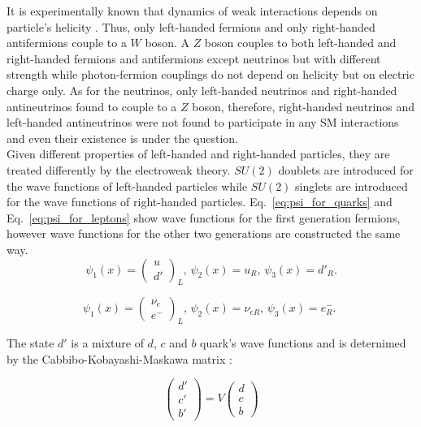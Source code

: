 It is experimentally known that dynamics of weak interactions depends on particle's helicity \cite{ref_Griffiths}. Thus, only left-handed fermions and only right-handed antifermions couple to a $W$ boson. A $Z$ boson couples to both left-handed and right-handed fermions and antifermions except neutrinos but with different strength while photon-fermion couplings do not depend on helicity but on electric charge only. As for the neutrinos, only left-handed neutrinos and right-handed antineutrinos found to couple to a $Z$ boson, therefore, right-handed neutrinos and left-handed antineutrinos were not found to participate in any SM interactions and even their existence is under the question.\\

Given different properties of left-handed and right-handed particles, they are treated differently by the electroweak theory. $SU(2)$ doublets are introduced for the wave functions of left-handed particles while $SU(2)$ singlets are introduced for the wave functions of right-handed particles. Eq.~\ref{eq:psi_for_quarks} and Eq.~\ref{eq:psi_for_leptons} show wave functions for the first generation fermions, however wave functions for the other two generations are constructed the same way.\\ 
 

\begin{equation}\label{eq:psi_for_quarks}
\psi_1(x)=\begin{pmatrix} u \\ d' \end{pmatrix}_L \text{, } \psi_2(x)=u_R \text{, } \psi_3(x)=d'_R \text{.}
\end{equation}

\begin{equation}\label{eq:psi_for_leptons}
\psi_1(x)=\begin{pmatrix} \nu_e \\ e^- \end{pmatrix}_L \text{, } \psi_2(x)=\nu_{eR} \text{, } \psi_3(x)=e^-_R \text{. }
\end{equation}

The state $d'$ is a mixture of $d$, $c$ and $b$ quark's wave functions and is deternimed by the Cabbibo-Kobayashi-Maskawa matrix \cite{ref_Pich}:

\begin{equation}
  \begin{pmatrix} d' \\ c' \\ b' \end{pmatrix} = V
  \begin{pmatrix} d \\ c \\ b \end{pmatrix}
\end{equation}


